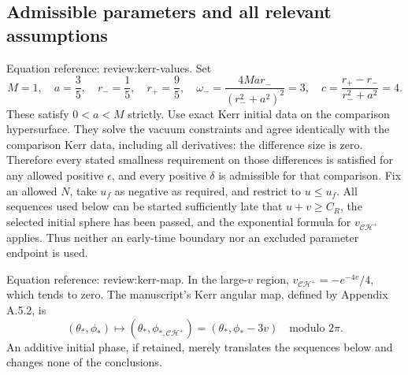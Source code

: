 \documentclass[10pt]{article}
\begin{document}
\subsection*{Admissible parameters and all relevant assumptions}
Equation reference: review:kerr-values. Set \[
 M=1,\quad a=\frac35,\quad
 r_-=\frac15,\quad r_+=\frac95,\quad
 \omega_-=\frac{4Mar_-}{(r_-^2+a^2)^2}=3,\quad
 c=\frac{r_+-r_-}{r_-^2+a^2}=4.\] These satisfy \(0<a<M\) strictly. Use exact Kerr initial data on the comparison hypersurface. They solve the vacuum constraints and agree identically with the comparison Kerr data, including all derivatives: the difference size is zero. Therefore every stated smallness requirement on those differences is satisfied for any allowed positive \(\epsilon\), and every positive \(\delta\) is admissible for that comparison. Fix an allowed \(N\), take \(u_f\) as negative as required, and restrict to \(u\leq u_f\). All sequences used below can be started sufficiently late that \(u+v\geq C_R\), the selected initial sphere has been passed, and the exponential formula for \(v_{\mathcal{CH}^{+}}\) applies. Thus neither an early-time boundary nor an excluded parameter endpoint is used.\par
Equation reference: review:kerr-map. In the large-\(v\) region, \(v_{\mathcal{CH}^{+}}=-e^{-4v}/4\), which tends to zero. The manuscript’s Kerr angular map, defined by Appendix A.5.2, is \[
 (\theta_*,\phi_*)\longmapsto
 (\theta_*,\phi_{*,\mathcal{CH}^{+}})=(\theta_*,\phi_*-3v)
 \quad \text{modulo }2\pi.\] An additive initial phase, if retained, merely translates the sequences below and changes none of the conclusions.\par
\end{document}
